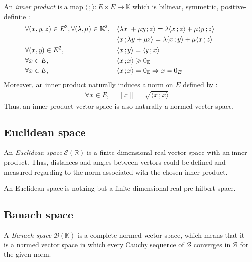 An \emph{inner product} is a map $\langle \,; \rangle : E \times E \longmapsto \mathbb{K}$ which is bilinear, symmetric, positive-definite :
\begin{align}
	&\forall (x,y,z) \in E^3, \forall (\lambda,\mu) \in \mathbb{K}^2, 	&& \langle \lambda x\ + \mu y \,; z\rangle  = \lambda \langle  x \,; z\rangle + \mu \langle  y\,; z\rangle&&&\\
	&												&& \langle x \,; \lambda y + \mu z \rangle  = \lambda \langle  x\,; y\rangle + \mu \langle  x \,; z\rangle&&&\notag\\
	&\forall (x,y) \in E^2, 									&& \langle x\,; y\rangle = \langle y\,; x\rangle &&&\\
	&\forall x \in E, 										&& \langle x\,; x\rangle \geqslant 0_\mathbb{K} &&&\\
	&\forall x \in E, 										&& \langle x\,; x\rangle = 0_\mathbb{K} \Rightarrow x = 0_E &&&
\end{align}
Moreover, an inner product naturally induces a norm on $E$ defined by :
\begin{align}
	\forall x \in E, \quad \|x\| = \sqrt{\langle x\,; x\rangle}
\end{align}
Thus, an inner product vector space is also naturally a normed vector space.

\subsection{Euclidean space}
An \emph{Euclidean space} $\mathcal{E}(\mathbb{R})$ is a finite-dimensional real vector space with an inner product.
Thus, distances and angles between vectors could be defined and measured regarding to the norm associated with the chosen inner product.

An Euclidean space is nothing but a finite-dimensional real pre-hilbert space.

\subsection{Banach space}

A \emph{Banach space} $\mathcal{B}(\mathbb{K})$ is a complete normed vector space, which means that it is a normed vector space in which every Cauchy sequence of $\mathcal{B}$ converges in $\mathcal{B}$ for the given norm.

